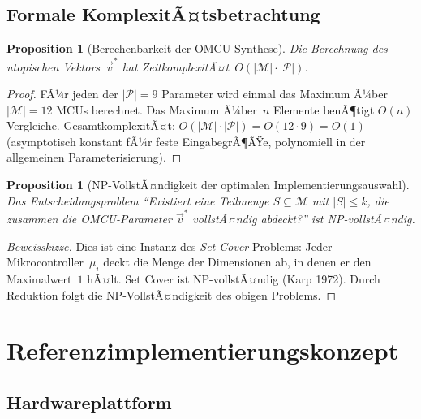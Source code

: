 ﻿\documentclass[12pt, a4paper]{article}
\theoremstyle{plain}
\newtheorem{proposition}[theorem]{Proposition}
\theoremstyle{definition}
\theoremstyle{remark}
\begin{document}
\subsection{Formale KomplexitÃ¤tsbetrachtung}

\begin{proposition}[Berechenbarkeit der OMCU-Synthese]
\label{prop:komplexitaet}
  Die Berechnung des utopischen Vektors~$\vec{v}^*$ hat
  ZeitkomplexitÃ¤t~$O(|\mathcal{M}| \cdot |\mathcal{P}|)$.
\end{proposition}

\begin{proof}
  FÃ¼r jeden der $|\mathcal{P}| = 9$ Parameter wird einmal das Maximum Ã¼ber
  $|\mathcal{M}| = 12$ MCUs berechnet. Das Maximum Ã¼ber~$n$ Elemente benÃ¶tigt
  $O(n)$ Vergleiche. GesamtkomplexitÃ¤t:
  $O(|\mathcal{M}| \cdot |\mathcal{P}|) = O(12 \cdot 9) = O(1)$
  (asymptotisch konstant fÃ¼r feste EingabegrÃ¶ÃŸe, polynomiell in der
  allgemeinen Parameterisierung).
\end{proof}

\begin{proposition}[NP-VollstÃ¤ndigkeit der optimalen Implementierungsauswahl]
\label{prop:np_implementierung}
  Das Entscheidungsproblem
  ``Existiert eine Teilmenge $S \subseteq \mathcal{M}$ mit $|S| \le k$,
  die zusammen die OMCU-Parameter $\vec{v}^*$ vollstÃ¤ndig abdeckt?''
  ist NP-vollstÃ¤ndig.
\end{proposition}

\begin{proof}[Beweisskizze]
  Dies ist eine Instanz des \emph{Set Cover}-Problems:
  Jeder Mikrocontroller~$\mu_i$ deckt die Menge der Dimensionen ab, in
  denen er den Maximalwert~$1$ hÃ¤lt.
  Set Cover ist NP-vollstÃ¤ndig (Karp 1972). Durch Reduktion folgt die
  NP-VollstÃ¤ndigkeit des obigen Problems.
 
\end{proof}

\section{Referenzimplementierungskonzept}
\label{sec:implementierung}

\subsection{Hardwareplattform}
\end{document}

